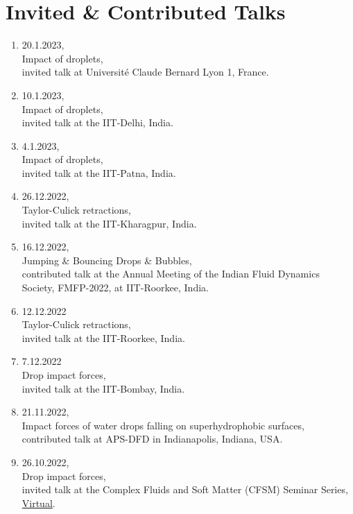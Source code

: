 \documentclass[11pt,a4paper,roman,english,colorlinks,linkcolor=true]{moderncv}
\begin{document}
\section{\textbf{Invited \& Contributed Talks}}
\begin{enumerate}[leftmargin=2.5cm]
	\item 20.1.2023,\\
	Impact of droplets,\\
	invited talk at Universit\'e Claude Bernard Lyon 1, France.
	
	\item 10.1.2023,\\
	Impact of droplets,\\
	invited talk at the IIT-Delhi, India.

	\item 4.1.2023,\\
	Impact of droplets,\\
	invited talk at the IIT-Patna, India.
	
	\item 26.12.2022,\\
	Taylor-Culick retractions,\\
	invited talk at the IIT-Kharagpur, India.
	
	\item 16.12.2022,\\
	Jumping \& Bouncing Drops \& Bubbles,\\
	contributed talk at the Annual Meeting of the Indian Fluid Dynamics Society, FMFP-2022, at IIT-Roorkee, India.
	
	\item 12.12.2022\\
	Taylor-Culick retractions,\\
	invited talk at the IIT-Roorkee, India.
	
	\item 7.12.2022\\
	Drop impact forces,\\
	invited talk at the IIT-Bombay, India.
	
	\item 21.11.2022,\\
	Impact forces of water drops falling on superhydrophobic surfaces,\\
	contributed talk at APS-DFD in Indianapolis, Indiana, USA.
	
	\item 26.10.2022,\\
	Drop impact forces,\\
	invited talk at the Complex Fluids and Soft Matter (CFSM) Seminar Series, \href{https://youtu.be/enTMAucwUDs}{Virtual}.
	

\end{enumerate}
\end{document}
